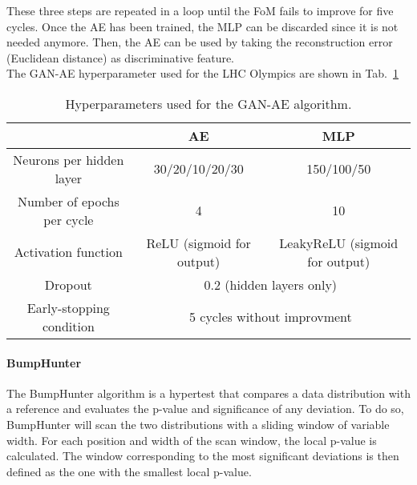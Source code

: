 \documentclass[a4paper,11pt]{article}
\begin{document}
\noindent These three steps are repeated in a loop until the FoM fails to improve for five cycles. Once the AE has been trained, the MLP can be discarded since it is not needed anymore. Then, the AE can be used by taking the reconstruction error (Euclidean distance) as discriminative feature.\\

\noindent The GAN-AE hyperparameter used for the LHC Olympics are shown in Tab.~\ref{tab:param_GAE}
\begin{table}[h!]
	\centering
	\begin{tabular}{|c|c|c|}
		\hline
		 & AE & MLP \\
		\hline
		Neurons per hidden layer & 30/20/10/20/30 &  150/100/50 \\
		\hline
		Number of epochs per cycle & 4 & 10 \\
		\hline
		Activation function & ReLU (sigmoid for output) & LeakyReLU (sigmoid for output) \\
		\hline
		Dropout & \multicolumn{2}{|c|}{ 0.2 (hidden layers only)} \\
		\hline
		Early-stopping condition & \multicolumn{2}{|c|}{5 cycles without improvment} \\
		\hline
	\end{tabular}
	\caption{Hyperparameters used for the GAN-AE algorithm.}
	\label{tab:param_GAE}
\end{table}

\paragraph{BumpHunter}
\label{sec:BH}

The BumpHunter algorithm is a hypertest that compares a data distribution with a reference and evaluates the p-value and significance of any deviation.
To do so, BumpHunter will scan the two distributions with a sliding window of variable width.
For each position and width of the scan window, the local p-value is calculated. The window corresponding to the most significant deviations is then defined as the one with the smallest local p-value.
\end{document}
